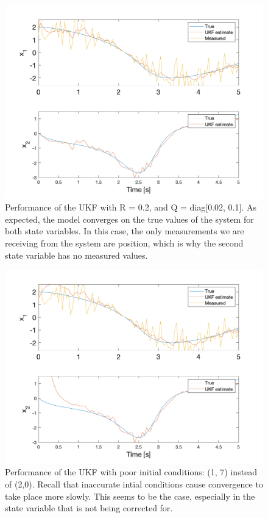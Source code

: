 \begin{figure}[h]
    \centering
    \includegraphics[scale = 0.6]{VDP.png}
    \caption{Performance of the UKF with R = 0.2, and Q = diag[0.02, 0.1].
    As expected, the model converges on the true values of the system for both state variables. In this case, the only measurements we are receiving from the system are position, which is why the second state variable has no measured values.}
\end{figure}
\begin{figure}[h]
    \centering
    \includegraphics[scale = 0.6]{VDP_badinitial.png}
    \caption{Performance of the UKF with poor initial conditions: (1, 7)  instead of (2,0). Recall that inaccurate intial conditions cause convergence to take place more slowly. This seems to be the case, especially in the state variable that is not being corrected for.}
\end{figure}


